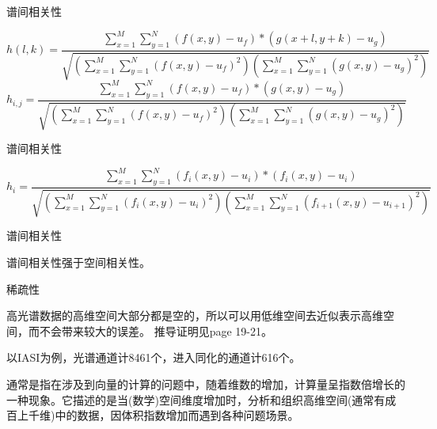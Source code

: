 \documentclass[aspectratio=43]{beamer}
\begin{document}
\begin{frame}{谱间相关性}
\begin{card}
\begin{equation}
h\left(l,k\right)=\frac{\sum\limits_{x=1}^{M}\sum\limits_{y=1}^{N}\left(f\left(x,y\right)-u_f\right)*\left(g\left(x+l,y+k\right)-u_g\right)}{\sqrt{\left(\sum\limits_{x=1}^{M}\sum\limits_{y=1}^{N}\left(f\left(x,y\right)-u_f\right)^2\right)\left(\sum\limits_{x=1}^{M}\sum\limits_{y=1}^{N}\left(g\left(x,y\right)-u_g\right)^2\right)}}
\end{equation}
\begin{equation}
h_{i,j}=\frac{\sum\limits_{x=1}^{M}\sum\limits_{y=1}^{N}\left(f\left(x,y\right)-u_f\right)*\left(g\left(x,y\right)-u_g\right)}{\sqrt{\left(\sum\limits_{x=1}^{M}\sum\limits_{y=1}^{N}\left(f\left(x,y\right)-u_f\right)^2\right)\left(\sum\limits_{x=1}^{M}\sum\limits_{y=1}^{N}\left(g\left(x,y\right)-u_g\right)^2\right)}}
\end{equation}
\end{card}
\end{frame}

\begin{frame}{谱间相关性}
\begin{card}
\begin{equation}
h_{i}=\frac{\sum\limits_{x=1}^{M}\sum\limits_{y=1}^{N}\left(f_i\left(x,y\right)-u_i\right)*\left(f_{i}\left(x,y\right)-u_{i}\right)}{\sqrt{\left(\sum\limits_{x=1}^{M}\sum\limits_{y=1}^{N}\left(f_i\left(x,y\right)-u_i\right)^2\right)\left(\sum\limits_{x=1}^{M}\sum\limits_{y=1}^{N}\left(f_{i+1}\left(x,y\right)-u_{i+1}\right)^2\right)}}
\end{equation}
\end{card}
\end{frame}


\begin{frame}{谱间相关性}
\begin{figure}
  \centering
{}

\end{figure}
{\color{primary}谱间相关性强于空间相关性。}
\end{frame}

\begin{frame}{稀疏性}
\begin{card}
高光谱数据的高维空间大部分都是空的，所以可以用低维空间去近似表示高维空间，而不会带来较大的误差。
推导证明见page 19-21\cite{陈雨时2014}。

以IASI为例，光谱通道计8461个，进入同化的通道计616个。
\end{card}
\begin{card}
通常是指在涉及到向量的计算的问题中，随着维数的增加，计算量呈指数倍增长的一种现象。它描述的是当(数学)空间维度增加时，分析和组织高维空间(通常有成百上千维)中的数据，因{\color{primary}体积指数增加}而遇到各种问题场景。
\end{card}
\end{frame}
\end{document}
